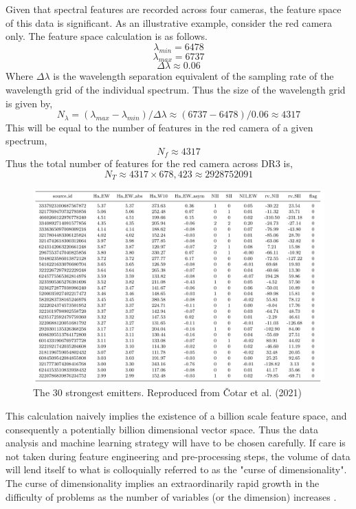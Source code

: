 Given that spectral features are recorded across four cameras, the feature space of this data is significant. As an illustrative example, consider the red camera only. The feature space calculation is as follows.
\[\lambda_{min} = 6478\]
\[\lambda_{max} = 6737\]
\[\Delta\lambda \approx 0.06\]
Where $\Delta\lambda$ is the wavelength separation equivalent of the sampling rate of the wavelength grid of the individual spectrum. Thus the size of the wavelength grid is given by, \[N_{\lambda} = (\lambda_{max}-\lambda_{min})/\Delta\lambda \approx (6737-6478)/0.06 \approx 4317\]
This will be equal to the number of features in the red camera of a given spectrum, \[N_{f} \approx 4317\]
Thus the total number of features for the red camera across DR3 is, \[N_{T} \approx 4317\times678,423 \approx \num[round-precision=2,round-mode=figures,
     scientific-notation=true]{2928752091}\]

\begin{figure}[t]
\centering
\includegraphics[scale=.35]{figures/cotartable.png}
\caption{The 30 strongest emitters. Reproduced from Čotar et al. (2021)\cite{vcotar2021galah}}
\end{figure}
This calculation naively implies the existence of a billion scale feature space, and consequently a potentially billion dimensional vector space. Thus the data analysis and machine learning strategy will have to be chosen carefully. If care is not taken during feature engineering and pre-processing steps, the volume of data will lend itself to what is colloquially referred to as the "curse of dimensionality". The curse of dimensionality implies an extraordinarily rapid growth in the difficulty of problems as the number of variables (or the dimension) increases \cite{kuo2005lifting}.

